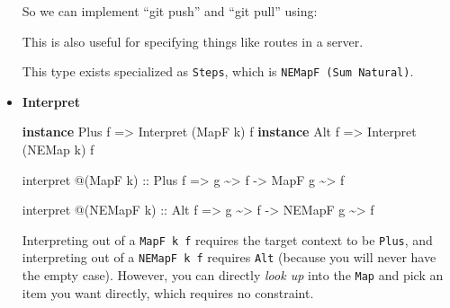 \documentclass[]{article}
\newenvironment{Shaded}{}{}
\newcommand{\DataTypeTok}[1]{\textcolor[rgb]{0.56,0.13,0.00}{#1}}
\newcommand{\KeywordTok}[1]{\textcolor[rgb]{0.00,0.44,0.13}{\textbf{#1}}}
\newcommand{\NormalTok}[1]{#1}
\newcommand{\OperatorTok}[1]{\textcolor[rgb]{0.40,0.40,0.40}{#1}}
\newcommand{\OtherTok}[1]{\textcolor[rgb]{0.00,0.44,0.13}{#1}}
\newcommand{\StringTok}[1]{\textcolor[rgb]{0.25,0.44,0.63}{#1}}
\begin{document}
\begin{itemize}
  So we can implement ``git push'' and ``git pull'' using:

\begin{Shaded}
\end{Shaded}

  This is also useful for specifying things like routes in a server.

  This type exists specialized as \texttt{Steps}, which is
  \texttt{NEMapF\ (Sum\ Natural)}.
\item
  \textbf{Interpret}

\begin{Shaded}
\begin{Highlighting}[]
\KeywordTok{instance} \DataTypeTok{Plus}\NormalTok{ f }\OtherTok{=\textgreater{}} \DataTypeTok{Interpret}\NormalTok{ (}\DataTypeTok{MapF}\NormalTok{  k) f}
\KeywordTok{instance} \DataTypeTok{Alt}\NormalTok{  f }\OtherTok{=\textgreater{}} \DataTypeTok{Interpret}\NormalTok{ (}\DataTypeTok{NEMap}\NormalTok{ k) f}

\NormalTok{interpret }\OperatorTok{@}\NormalTok{(}\DataTypeTok{MapF}\NormalTok{ k)}
\OtherTok{    ::} \DataTypeTok{Plus}\NormalTok{ f}
    \OtherTok{=\textgreater{}}\NormalTok{ g }\OperatorTok{\textasciitilde{}\textgreater{}}\NormalTok{ f}
    \OtherTok{{-}\textgreater{}} \DataTypeTok{MapF}\NormalTok{ g }\OperatorTok{\textasciitilde{}\textgreater{}}\NormalTok{ f}

\NormalTok{interpret }\OperatorTok{@}\NormalTok{(}\DataTypeTok{NEMapF}\NormalTok{ k)}
\OtherTok{    ::} \DataTypeTok{Alt}\NormalTok{ f}
    \OtherTok{=\textgreater{}}\NormalTok{ g }\OperatorTok{\textasciitilde{}\textgreater{}}\NormalTok{ f}
    \OtherTok{{-}\textgreater{}} \DataTypeTok{NEMapF}\NormalTok{ g }\OperatorTok{\textasciitilde{}\textgreater{}}\NormalTok{ f}
\end{Highlighting}
\end{Shaded}

  Interpreting out of a \texttt{MapF\ k\ f} requires the target context to be
  \texttt{Plus}, and interpreting out of a \texttt{NEMapF\ k\ f} requires
  \texttt{Alt} (because you will never have the empty case). However, you can
  directly \emph{look up} into the \texttt{Map} and pick an item you want
  directly, which requires no constraint.
\end{itemize}
\end{document}
